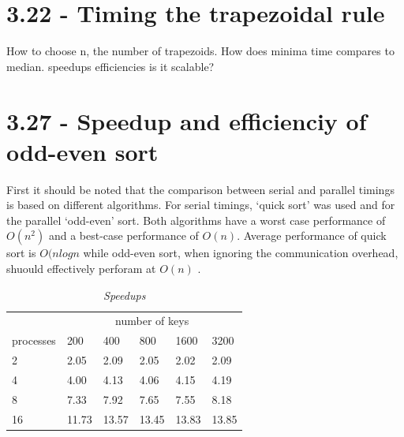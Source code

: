 \documentclass[a4paper,11pt,twoside]{article}
\begin{document}
\section{3.22 - Timing the trapezoidal rule}
How to choose n, the number of trapezoids.
How does minima time compares to median.
speedups
efficiencies
is it scalable?

\section{3.27 - Speedup and efficienciy of odd-even sort}
First it should be noted that the comparison between serial and parallel timings is based on different algorithms. For serial timings, `quick sort' was used and for the parallel `odd-even' sort. Both algorithms have a worst case performance of $O(n^{2})$ and a best-case performance of $O(n)$. Average performance of quick sort is $O(n log n$ while odd-even sort, when ignoring the communication overhead, shuould effectively perforam at $O(n)$ \cite{hanke_kth}. 

\begin{table}[]
\centering
\caption{\textit{Speedups}}
\label{tab:speedups}
\begin{tabular}{llllll}
\multicolumn{1}{l|}{}          & \multicolumn{5}{c}{number of keys}                                                                                 \\ \cline{2-6} 
\multicolumn{1}{l|}{processes} & \multicolumn{1}{l|}{200} & \multicolumn{1}{l|}{400} & \multicolumn{1}{l|}{800} & \multicolumn{1}{l|}{1600} & 3200  \\ \hline
2                              & 2.05                     & 2.09                     & 2.05                     & 2.02                      & 2.09  \\
4                              & 4.00                     & 4.13                     & 4.06                     & 4.15                      & 4.19  \\
8                              & 7.33                     & 7.92                     & 7.65                     & 7.55                      & 8.18  \\
16                             & 11.73                    & 13.57                    & 13.45                    & 13.83                     & 13.85
\end{tabular}
\end{table}
\end{document}
